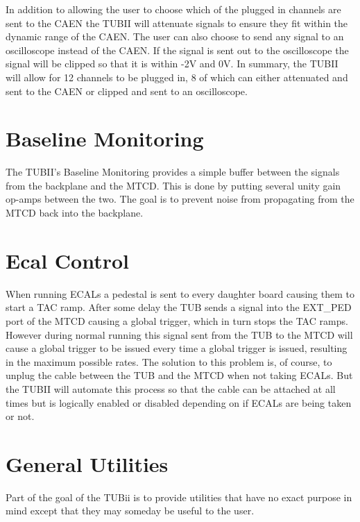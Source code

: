 \documentclass[11pt,a4paper]{article}
\begin{document}
    In addition to allowing the user to choose which of the plugged in channels are sent to the CAEN the TUBII will attenuate signals to ensure they fit within the dynamic range of the CAEN. The user can also choose to send any signal to an oscilloscope instead of the CAEN. If the signal is sent out to the oscilloscope the signal will be clipped so that it is within -2V and 0V. In summary, the TUBII will allow for 12 channels to be plugged in, 8 of which can either attenuated and sent to the CAEN or clipped and sent to an oscilloscope. 
\section{Baseline Monitoring}
The TUBII's Baseline Monitoring provides a simple buffer between the signals from the backplane and the MTCD. This is done by putting several unity gain op-amps between the two. The goal is to prevent noise from propagating from the MTCD back into the backplane. 

\section{Ecal Control}
When running ECALs a pedestal is sent to every daughter board causing them to start a TAC ramp. After some delay the TUB sends a signal into the EXT\_PED port of the MTCD causing a global trigger, which in turn stops the TAC ramps. However during normal running this signal sent from the TUB to the MTCD will cause a global trigger to be issued every time a global trigger is issued, resulting in the maximum possible rates. The solution to this problem is, of course, to unplug the cable between the TUB and the MTCD when not taking ECALs. But the TUBII will automate this process so that the cable can be attached at all times but is logically enabled or disabled depending on if ECALs are being taken or not. 

\section{General Utilities}

Part of the goal of the TUBii is to provide utilities that have no exact purpose in mind except that they may someday be useful to the user.
\end{document}

